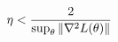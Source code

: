 \documentclass[preview]{standalone}
\begin{document}
\begin{align*}
\special{dvisvgm:raw <g id='unique000'>}\eta < \frac{2}{\sup_\theta\|\nabla^2 L(\theta)\|}\special{dvisvgm:raw </g>}
\end{align*}
\end{document}
